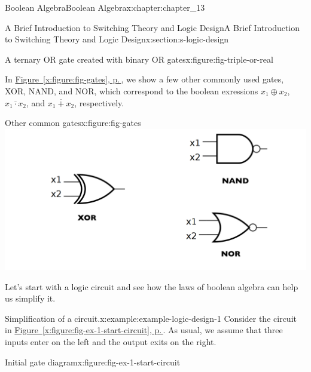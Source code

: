 \documentclass[twoside,10pt,]{book}
\newcommand{\xreffont}{\relax}
\numberwithin{equation}{section}
\begin{document}
\begin{chapterptx}{Boolean Algebra}{}{Boolean Algebra}{}{}{x:chapter:chapter_13}
\begin{sectionptx}{A Brief Introduction to Switching Theory and Logic Design}{}{A Brief Introduction to Switching Theory and Logic Design}{}{}{x:section:s-logic-design}
\begin{sidebyside}{2}{0}{0}{0}
\begin{sbspanel}{0.5}
\begin{figureptx}{A ternary OR gate created with binary OR gates}{x:figure:fig-triple-or-real}{}
\tcblower
\end{figureptx}%
\end{sbspanel}%
\end{sidebyside}%
\begin{sidebyside}{2}{0}{0}{0}%
\begin{sbspanel}{0.5}%
In \hyperref[x:figure:fig-gates]{Figure~{\xreffont\ref{x:figure:fig-gates}}, p.\,\pageref{x:figure:fig-gates}}, we show a few other commonly used gates, XOR, NAND, and NOR, which correspond to the boolean exressions \(x_1 \oplus x_2\), \(\overline{x_1 \cdot x_2}\), and \(\overline{x_1 + x_2}\), respectively.%
\end{sbspanel}%
\begin{sbspanel}{0.5}%
\begin{figureptx}{Other common gates}{x:figure:fig-gates}{}%
\includegraphics[width=\linewidth]{images/fig-gates.png}
\tcblower
\end{figureptx}%
\end{sbspanel}%
\end{sidebyside}%
\par
Let's start with a logic circuit and see how the laws of boolean algebra can help us simplify it.%
\begin{example}{Simplification of a circuit.}{x:example:example-logic-design-1}%
Consider the  circuit in \hyperref[x:figure:fig-ex-1-start-circuit]{Figure~{\xreffont\ref{x:figure:fig-ex-1-start-circuit}}, p.\,\pageref{x:figure:fig-ex-1-start-circuit}}. As usual, we assume that three inputs enter on the left and the output exits on the right.%
\begin{figureptx}{Initial gate diagram}{x:figure:fig-ex-1-start-circuit}{}%
\begin{image}{0.1}{0.8}{0.1}%

\end{image}
\end{figureptx}
\end{example}
\end{sectionptx}
\end{chapterptx}
\end{document}
